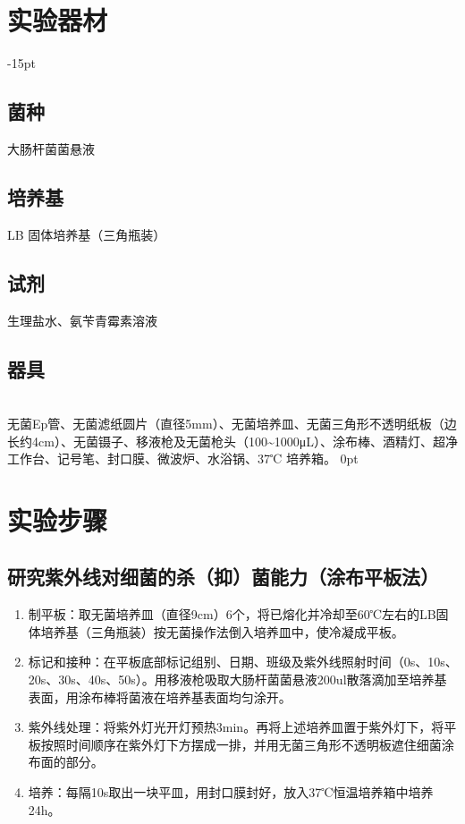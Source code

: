 \documentclass[UTF8]{ctexart}
\newcommand{\setParDis}{\setlength {\parskip} {-15pt} }
\newcommand{\setParDef}{\setlength {\parskip} {0pt} }
\begin{document}
    
    
    
    \section{实验器材}
    \setParDis
    \subsection{菌种}大肠杆菌菌悬液
    \subsection{培养基}LB 固体培养基（三角瓶装）
    \subsection{试剂}生理盐水、氨苄青霉素溶液
    \subsection{器具}
    
    \
    \\
    \indent 无菌Ep管、无菌滤纸圆片（直径5mm）、无菌培养皿、无菌三角形不透明纸板（边长约4cm）、无菌镊子、移液枪及无菌枪头（100\textasciitilde1000μL）、涂布棒、酒精灯、超净工作台、记号笔、封口膜、微波炉、水浴锅、37℃ 培养箱。
    \setParDef

    \section{实验步骤}

    \subsection{研究紫外线对细菌的杀（抑）菌能力（涂布平板法）}
    \begin{enumerate}
        \setlength{\parsep}{-40pt}
        \setlength{\itemsep}{-2pt}
        \item 制平板：取无菌培养皿（直径9cm）6个，将已熔化并冷却至60℃左右的LB固体培养基（三角瓶装）按无菌操作法倒入培养皿中，使冷凝成平板。
        \item 标记和接种：在平板底部标记组别、日期、班级及紫外线照射时间（0s、10s、20s、30s、40s、50s）。用移液枪吸取大肠杆菌菌悬液200ul散落滴加至培养基表面，用涂布棒将菌液在培养基表面均匀涂开。
        \item 紫外线处理：将紫外灯光开灯预热3min。再将上述培养皿置于紫外灯下，将平板按照时间顺序在紫外灯下方摆成一排，并用无菌三角形不透明板遮住细菌涂布面的部分。
        \item 培养：每隔10s取出一块平皿，用封口膜封好，放入37℃恒温培养箱中培养24h。
    \end{enumerate}
\end{document}
